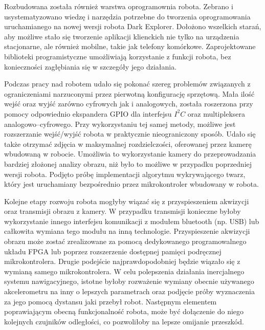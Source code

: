 Rozbudowana została również warstwa oprogramownia robota. Zebrano i
usystematyzowano wiedzę i narzędzia potrzebne do tworzenia oprogramowania
uruchamianego na nowej wersji robota Dark Explorer. Dołożono wszelkich starań,
aby możliwe stało się tworzenie aplikacji klienckich nie tylko na urządzenia
stacjonarne, ale również mobilne, takie jak telefony komórkowe. Zaprojektowane
biblioteki programistyczne umożliwiają korzystanie z funkcji robota, bez
konieczności zagłębiania się w szczegóły jego działania. 

Podczas pracy nad robotem udało się pokonać szereg problemów związanych z
ograniczeniami narzuconymi przez pierwotną konfigurację sprzętową. Mała ilość
wejść oraz wyjść zarówno cyfrowych jak i analogowych, została roszerzona przy
pomocy odpowiednio ekspandera GPIO dla interfejsu $I^{2}C$ oraz multipleksera
analogowo--cyfrowego. Przy wykorzystaniu tej samej metody, możliwe jest
rozszerzanie wejść/wyjść robota w praktycznie nieograniczony sposób. Udało się
także otrzymać zdjęcia w maksymalnej rozdzielczości, oferowanej przez kamerę
wbudowaną w robocie. Umożliwia to wykorzystanie kamery do przeprowadzania
bardziej złożonej analizy obrazu, niż było to możliwe w przypadku poprzedniej
wersji robota. Podjęto próbę implementacji algorytmu wykrywającego twarz, który
jest uruchamiany bezpośrednio przez mikrokontroler wbudowany w robota. 

Kolejne etapy rozwoju robota mogłyby wiązać się z przyspieszeniem akwizycji oraz
transmisji obrazu z kamery. W przypadku transmisji konieczne byłoby
wykorzystanie innego interfejsu komunikacji z modułem bluetooth (np. USB) lub
całkowita wymiana tego modułu na inną technologie. Przyspieszenie akwizycji
obrazu może zostać zrealizowane za pomocą dedykowanego programowalnego układu
FPGA lub poprzez rozszerzenie dostępnej pamięci podręcznej mikrokontrolera.
Drugie podejście najprawdopodobniej będzie wiązało się z wymianą samego
mikrokontrolera. W celu polepszenia działania inercjalnego systemu
nawigacyjnego, istotne byłoby rozważenie wymiany obecnie używanego akcelerometru
na inny o lepszych parametrach oraz podjęcie próby wyznaczenia za jego pomocą
dystansu jaki przebył robot. Następnym elementem poprawiającym obecną
funkcjonalność robota, może być dołączenie do niego kolejnych czujników
odległości, co pozwoliłoby na lepsze omijanie przeszkód. 
